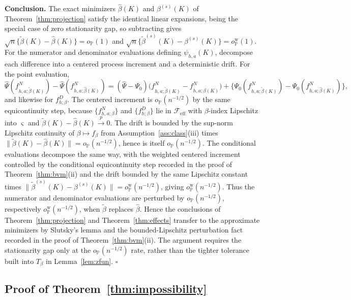 \documentclass[11pt]{article}
\newcommand{\Pp}{\mathbb P}
\newcommand{\opro}{o_{\Pp}}
\newcommand{\pto}{\overset{p}{\to}}
\newcommand{\calF}{\mathcal F}
\newcommand{\hPsi}{\widehat\Psi}
\newcommand{\norm}[1]{\lVert #1\rVert}
\begin{document}
\textbf{Conclusion.} The exact minimizers $\hat\beta(K)$ and $\beta^{(s)}(K)$ of Theorem~\ref{thm:projection} satisfy the identical linear expansions, being the special case of zero stationarity gap, so subtracting gives $\sqrt n\{\tilde\beta(K)-\hat\beta(K)\}=\opro(1)$ and $\sqrt n\{\tilde\beta^{(s)}(K)-\beta^{(s)}(K)\}=\opro^{\mathrm w}(1)$. For the numerator and denominator evaluations defining $\psi_{h,a}(K)$, decompose each difference into a centered process increment and a deterministic drift. For the point evaluation,
\begin{equation*}
\hPsi(f^N_{h,a;\tilde\beta(K)})-\hPsi(f^N_{h,a;\hat\beta(K)})
=(\hPsi-\Psi_0)\bigl(f^N_{h,a;\tilde\beta(K)}-f^N_{h,a;\hat\beta(K)}\bigr)
+\bigl\{\Psi_0(f^N_{h,a;\tilde\beta(K)})-\Psi_0(f^N_{h,a;\hat\beta(K)})\bigr\},
\end{equation*}
and likewise for $f^D_{h;\beta}$. The centered increment is $\opro(n^{-1/2})$ by the same equicontinuity step, because $\{f^N_{h,a;\beta}\}$ and $\{f^D_{h;\beta}\}$ lie in $\calF_{\mathrm{eff}}$ with $\beta$-index Lipschitz into $\varsigma$ and $\tilde\beta(K)-\hat\beta(K)\pto0$. The drift is bounded by the sup-norm Lipschitz continuity of $\beta\mapsto f_\beta$ from Assumption~\ref{ass:class}(iii) times $\norm{\tilde\beta(K)-\hat\beta(K)}=\opro(n^{-1/2})$, hence is itself $\opro(n^{-1/2})$. The conditional evaluations decompose the same way, with the weighted centered increment controlled by the conditional equicontinuity step recorded in the proof of Theorem~\ref{thm:bvm}\textup{(ii)} and the drift bounded by the same Lipschitz constant times $\norm{\tilde\beta^{(s)}(K)-\beta^{(s)}(K)}=\opro^{\mathrm w}(n^{-1/2})$, giving $\opro^{\mathrm w}(n^{-1/2})$. Thus the numerator and denominator evaluations are perturbed by $\opro(n^{-1/2})$, respectively $\opro^{\mathrm w}(n^{-1/2})$, when $\tilde\beta$ replaces $\hat\beta$. Hence the conclusions of Theorem~\ref{thm:projection} and Theorem~\ref{thm:effects} transfer to the approximate minimizers by Slutsky's lemma and the bounded-Lipschitz perturbation fact recorded in the proof of Theorem~\ref{thm:bvm}\textup{(ii)}. The argument requires the stationarity gap only at the $\opro(n^{-1/2})$ rate, rather than the tighter tolerance built into $T_\beta$ in Lemma~\ref{lem:zfun}. \hfill$\square$

\subsection{Proof of Theorem~\ref{thm:impossibility}}\label{app:impossibility}
\end{document}
